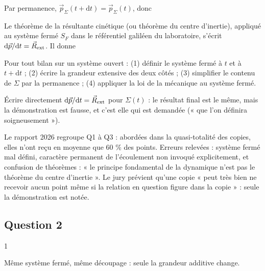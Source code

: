 \documentclass[11pt,a4paper]{article}
\newcommand{\equationajustee}[1]{%
  \sbox{\boiteequation}{$\displaystyle #1$}%
  \ifdim\wd\boiteequation>\linewidth
    \[\resizebox{\linewidth}{!}{\usebox{\boiteequation}}\]%
  \else
    \[#1\]%
  \fi}
\begin{document}
Par permanence, \(\vec p_\Sigma(t+\mathrm dt)=\vec p_\Sigma(t)\), donc

\equationajustee{\boxed{\mathrm d\vec p=\mu Q\,(\vec v_s-\vec v_e)\,\mathrm dt}}

Le théorème de la résultante cinétique (ou théorème du centre d'inertie), appliqué au système fermé \(S_F\) dans le référentiel galiléen du laboratoire, s'écrit \(\mathrm d\vec p/\mathrm dt=\vec R_{\rm ext}\). Il donne

\equationajustee{\boxed{\mu Q\,(\vec v_s-\vec v_e)=\vec R_{\rm ext}}}

\begin{methode}

Pour tout bilan sur un système ouvert : (1) définir le système fermé à \(t\) et à \(t+\mathrm dt\) ; (2) écrire la grandeur extensive des deux côtés ; (3) simplifier le contenu de \(\Sigma\) par la permanence ; (4) appliquer la loi de la mécanique au système fermé.

\end{methode}

\begin{piege}

Écrire directement \(\mathrm d\vec p/\mathrm dt=\vec R_{\rm ext}\) pour \(\Sigma(t)\) : le résultat final est le même, mais la démonstration est fausse, et c'est elle qui est demandée (« que l'on définira soigneusement »).

\end{piege}

\begin{jury}

Le rapport 2026 regroupe Q1 à Q3 : abordées dans la quasi-totalité des copies, elles n'ont reçu en moyenne que 60 \% des points. Erreurs relevées : système fermé mal défini, caractère permanent de l'écoulement non invoqué explicitement, et confusion de théorèmes : « le principe fondamental de la dynamique n'est pas le théorème du centre d'inertie ». Le jury prévient qu'une copie « peut très bien ne recevoir aucun point même si la relation en question figure dans la copie » : seule la démonstration est notée.

\end{jury}

\hypertarget{question-2}{%
\subsection{Question 2}\label{question-2}}

\begin{indication}{1}

Même système fermé, même découpage : seule la grandeur additive change.

\end{indication}
\end{document}
